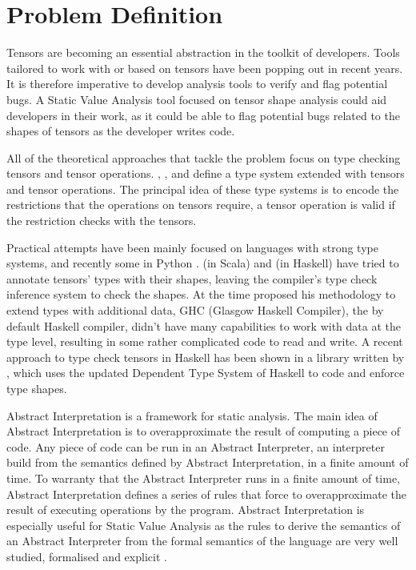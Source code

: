 \documentclass[
11pt, %
english, %
singlespacing, %
headsepline, %
]{MastersDoctoralThesis} %
\begin{document}
\hypertarget{problem-definition}{%
\section{Problem Definition}\label{problem-definition}}

Tensors are becoming an essential abstraction in the toolkit of
developers. Tools tailored to work with or based on tensors have been
popping out in recent years. It is therefore imperative to develop
analysis tools to verify and flag potential bugs. A Static Value
Analysis tool focused on tensor shape analysis could aid developers in
their work, as it could be able to flag potential bugs related to the
shapes of tensors as the developer writes code.

All of the theoretical approaches that tackle the problem focus on type
checking tensors and tensor operations. \textcite{griffioen_type_2015},
\textcite{slepak_array-oriented_2014}, and \textcite{rink_modeling_2018}
define a type system extended with tensors and tensor operations. The
principal idea of these type systems is to encode the restrictions that
the operations on tensors require, a tensor operation is valid if the
restriction checks with the tensors.

Practical attempts have been mainly focused on languages with strong
type systems, and recently some in Python
\autocites{fromherz_static_2018}{monat_static_2018}.
\textcite{chen_typesafe_2017} (in Scala) and
\textcite{eaton_statically_2006} (in Haskell) have tried to annotate
tensors' types with their shapes, leaving the compiler's type check
inference system to check the shapes. At the time
\textcite{eaton_statically_2006} proposed his methodology to extend
types with additional data, GHC (Glasgow Haskell Compiler), the by
default Haskell compiler, didn't have many capabilities to work with
data at the type level, resulting in some rather complicated code to
read and write. A recent approach to type check tensors in Haskell has
been shown in a library written by \textcite{elkin_haskell_2018}, which
uses the updated Dependent Type System of Haskell to code and enforce
type shapes.

Abstract Interpretation is a framework for static analysis. The main
idea of Abstract Interpretation is to overapproximate the result of
computing a piece of code. Any piece of code can be run in an Abstract
Interpreter, an interpreter build from the semantics defined by Abstract
Interpretation, in a finite amount of time. To warranty that the
Abstract Interpreter runs in a finite amount of time, Abstract
Interpretation defines a series of rules that force to overapproximate
the result of executing operations by the program. Abstract
Interpretation is especially useful for Static Value Analysis as the
rules to derive the semantics of an Abstract Interpreter from the formal
semantics of the language are very well studied, formalised and explicit
\autocite{cousot_abstract_1977}.
\end{document}
